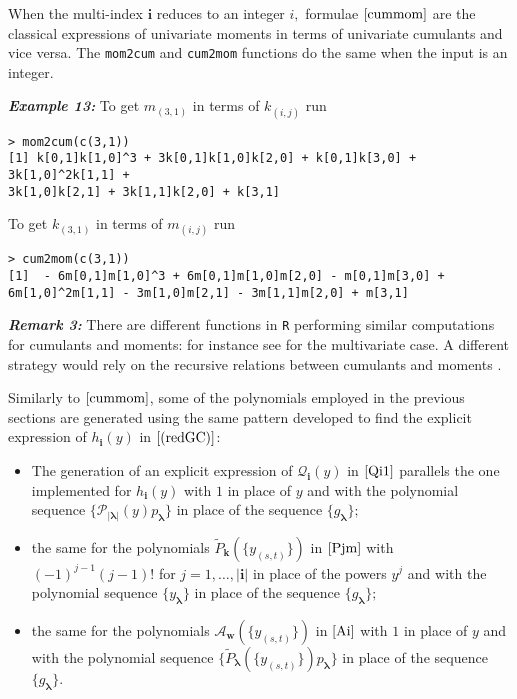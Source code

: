 When the multi-index \(\boldsymbol{i}\) reduces to an integer \(i,\)
formulae \(\eqref{cummom}\) are the classical expressions of univariate
moments in terms of univariate cumulants and vice versa. The
\texttt{mom2cum} and \texttt{cum2mom} functions do the same when the
input is an integer.

\hskip-0.5cm\textbf{\emph{Example 13:}} To get \(m_{(3,1)}\) in terms of
\(k_{(i,j)}\) run

\begin{verbatim}
> mom2cum(c(3,1))
[1] k[0,1]k[1,0]^3 + 3k[0,1]k[1,0]k[2,0] + k[0,1]k[3,0] + 3k[1,0]^2k[1,1] +
3k[1,0]k[2,1] + 3k[1,1]k[2,0] + k[3,1]
\end{verbatim}

\noindent To get \(k_{(3,1)}\) in terms of \(m_{(i,j)}\) run

\begin{verbatim}
> cum2mom(c(3,1))
[1]  - 6m[0,1]m[1,0]^3 + 6m[0,1]m[1,0]m[2,0] - m[0,1]m[3,0] + 
6m[1,0]^2m[1,1] - 3m[1,0]m[2,1] - 3m[1,1]m[2,0] + m[3,1]
\end{verbatim}

\hskip-0.5cm\textbf{\emph{Remark 3:}} There are different functions in
\texttt{R} performing similar computations for cumulants and moments:
for instance see \citet{Leeuw} for the multivariate case. A different
strategy would rely on the recursive relations between cumulants and
moments \citep{MR3809541}.

Similarly to \(\eqref{cummom}\), some of the polynomials employed in the
previous sections are generated using the same pattern developed to find
the explicit expression of \(h_{\boldsymbol{i}}(y)\) in
\(\eqref{(redGC)}\):

\begin{itemize}
\item
  The generation of an explicit expression of
  \({\mathcal Q}_{\boldsymbol{i}}(y)\) in \(\eqref{Qi1}\) parallels the
  one implemented for \(h_{\boldsymbol{i}}(y)\) with \(1\) in place of
  \(y\) and with the polynomial sequence
  \(\{{\mathcal P}_{|\boldsymbol{\lambda}|}(y) p_{\boldsymbol{\lambda}}\}\)
  in place of the sequence \(\{g_{\boldsymbol{\lambda}}\};\)
\item
  the same for the polynomials
  \(\tilde{P}_{\boldsymbol{k}}\left( \{y_{(s,t)}\} \right)\) in
  \(\eqref{Pjm}\) with \((-1)^{j-1} (j-1)!\) for
  \(j=1,\ldots,|\boldsymbol{i}|\) in place of the powers \(y^j\) and
  with the polynomial sequence \(\{y_{\boldsymbol{\lambda}}\}\) in place
  of the sequence \(\{g_{\boldsymbol{\lambda}}\};\)
\item
  the same for the polynomials
  \({\mathcal A}_{\boldsymbol{w}} \left( \{y_{(s,t)}\} \right)\) in
  \(\eqref{Ai}\) with \(1\) in place of \(y\) and with the polynomial
  sequence
  \(\bigg\{\tilde{P}_{\boldsymbol{\lambda}}\left( \{y_{(s,t)}\} \right)p_{\boldsymbol{\lambda}}\bigg\}\)
  in place of the sequence \(\{g_{\boldsymbol{\lambda}}\}.\)
\end{itemize}

